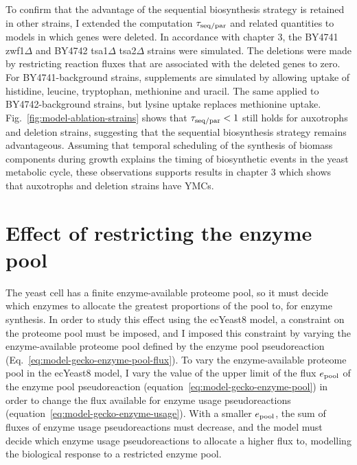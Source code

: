 To confirm that the advantage of the sequential biosynthesis strategy is retained in other strains, I extended the computation $\tau_{\mathrm{seq}/\mathrm{par}}$ and related quantities to models in which genes were deleted.
In accordance with chapter 3, the BY4741 zwf1$\Delta$ and BY4742 tsa1$\Delta$ tsa2$\Delta$ strains were simulated.
The deletions were made by restricting reaction fluxes that are associated with the deleted genes to zero.
For BY4741-background strains, supplements are simulated by allowing uptake of histidine, leucine, tryptophan, methionine and uracil.
The same applied to BY4742-background strains, but lysine uptake replaces methionine uptake.
Fig.\ \ref{fig:model-ablation-strains} shows that $\tau_{\mathrm{seq}/\mathrm{par}} < 1$ still holds for auxotrophs and deletion strains, suggesting that the sequential biosynthesis strategy remains advantageous.
Assuming that temporal scheduling of the synthesis of biomass components during growth explains the timing of biosynthetic events in the yeast metabolic cycle, these observations supports results in chapter 3 which shows that auxotrophs and deletion strains have YMCs.


\section{Effect of restricting the enzyme pool}
\label{sec:model-pool}

The yeast cell has a finite enzyme-available proteome pool, so it must decide which enzymes to allocate the greatest proportions of the pool to, for enzyme synthesis.
In order to study this effect using the ecYeast8 model, a constraint on the proteome pool must be imposed, and I imposed this constraint by varying the enzyme-available proteome pool defined by the enzyme pool pseudoreaction (Eq.\ \ref{eq:model-gecko-enzyme-pool-flux}).
To vary the enzyme-available proteome pool in the ecYeast8 model,
I vary the value of the upper limit of the flux $e_{\mathrm{pool}}$ of the enzyme pool pseudoreaction (equation~\ref{eq:model-gecko-enzyme-pool}) in order to change the flux available for enzyme usage pseudoreactions (equation~\ref{eq:model-gecko-enzyme-usage}).
With a smaller $e_{\mathrm{pool}}$, the sum of fluxes of enzyme usage pseudoreactions must decrease, and the model must decide which enzyme usage pseudoreactions to allocate a higher flux to, modelling the biological response to a restricted enzyme pool.

